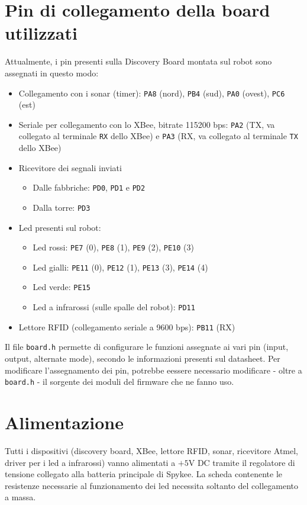\section{Pin di collegamento della board utilizzati}
Attualmente, i pin presenti sulla Discovery Board montata sul robot sono assegnati in questo modo:
\begin{itemize}
\item Collegamento con i sonar (timer): \verb|PA8| (nord), \verb|PB4| (sud), \verb|PA0| (ovest), \verb|PC6| (est)
\item Seriale per collegamento con lo XBee, bitrate 115200 bps: \verb|PA2| (TX, va collegato al terminale \verb|RX| dello XBee) e \verb|PA3| (RX, va collegato al terminale \verb|TX| dello XBee)
\item Ricevitore dei segnali inviati
	\begin{itemize}
	\item Dalle fabbriche: \verb|PD0|, \verb|PD1| e \verb|PD2|
	\item Dalla torre: \verb|PD3|
	\end{itemize}
\item Led presenti sul robot:
	\begin{itemize}
	\item Led rossi: \verb|PE7| (0), \verb|PE8| (1), \verb|PE9| (2), \verb|PE10| (3)
	\item Led gialli: \verb|PE11| (0), \verb|PE12| (1), \verb|PE13| (3), \verb|PE14| (4)
	\item Led verde: \verb|PE15|
	\item Led a infrarossi (sulle spalle del robot): \verb|PD11|
	\end{itemize}
\item Lettore RFID (collegamento seriale a 9600 bps): \verb|PB11| (RX)
\end{itemize}
\begin{nota}
Il file \verb|board.h| permette di configurare le funzioni assegnate ai vari pin (input, output, alternate mode), secondo le informazioni presenti sul datasheet. Per modificare l'assegnamento dei pin, potrebbe eessere necessario modificare - oltre a \verb|board.h| - il sorgente dei moduli del firmware che ne fanno uso.
\end{nota}

\section{Alimentazione} Tutti i dispositivi (discovery board, XBee, lettore RFID, sonar, ricevitore Atmel, driver per i led a infrarossi) vanno alimentati a $+5$V DC tramite il regolatore di tensione collegato alla batteria principale di Spykee. La scheda contenente le resistenze necessarie al funzionamento dei led necessita soltanto del collegamento a massa.

